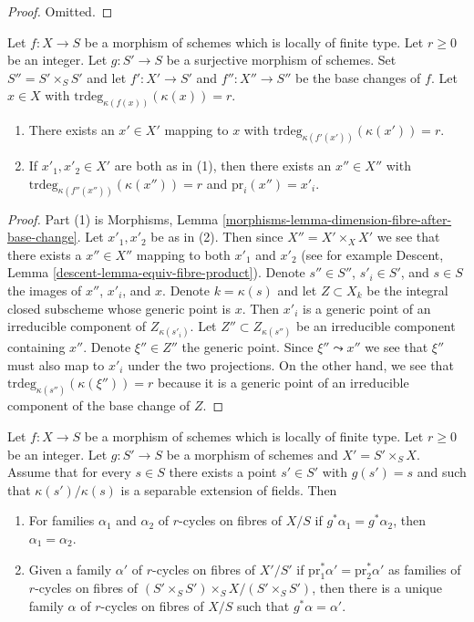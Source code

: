 \begin{proof}
Omitted.
\end{proof}

\begin{lemma}
\label{lemma-coequalizer-dim-r}
Let $f : X \to S$ be a morphism of schemes which is locally of finite type.
Let $r \geq 0$ be an integer. Let $g : S' \to S$ be a surjective morphism of
schemes. Set $S'' = S' \times_S S'$ and let $f' : X' \to S'$
and $f'' : X'' \to S''$ be the base changes of $f$.
Let $x \in X$ with $\text{trdeg}_{\kappa(f(x))}(\kappa(x)) = r$.
\begin{enumerate}
\item There exists an $x' \in X'$ mapping to $x$
with $\text{trdeg}_{\kappa(f'(x'))}(\kappa(x')) = r$.
\item If $x'_1, x'_2 \in X'$ are both as in (1), then there
exists an $x'' \in X''$ with
$\text{trdeg}_{\kappa(f''(x''))}(\kappa(x'')) = r$ and
$\text{pr}_i(x'') = x'_i$.
\end{enumerate}
\end{lemma}

\begin{proof}
Part (1) is
Morphisms, Lemma \ref{morphisms-lemma-dimension-fibre-after-base-change}.
Let $x'_1, x'_2$ be as in (2). Then since $X'' = X' \times_X X'$
we see that there
exists a $x'' \in X''$ mapping to both $x'_1$ and $x'_2$ (see for
example Descent, Lemma \ref{descent-lemma-equiv-fibre-product}).
Denote $s'' \in S''$, $s'_i \in S'$, and $s \in S$ the images
of $x''$, $x'_i$, and $x$.
Denote $k = \kappa(s)$ and let $Z \subset X_k$ be the integral
closed subscheme whose generic point is $x$. Then $x'_i$
is a generic point of an irreducible component of $Z_{\kappa(s'_i)}$.
Let $Z'' \subset Z_{\kappa(s'')}$ be an irreducible component
containing $x''$. Denote $\xi'' \in Z''$ the generic point.
Since $\xi'' \leadsto x''$ we see that $\xi''$ must also
map to $x'_i$ under the two projections. On the other hand,
we see that $\text{trdeg}_{\kappa(s'')}(\kappa(\xi'')) = r$
because it is a generic
point of an irreducible component of the base change of $Z$.
\end{proof}

\begin{lemma}
\label{lemma-descend-family}
Let $f : X \to S$ be a morphism of schemes which is locally of finite type.
Let $r \geq 0$ be an integer. Let $g : S' \to S$ be a morphism of
schemes and $X' = S' \times_S X$. Assume that for every $s \in S$ there
exists a point $s' \in S'$ with $g(s') = s$ and such that
$\kappa(s')/\kappa(s)$ is a separable extension of fields. Then
\begin{enumerate}
\item For families $\alpha_1$ and $\alpha_2$ of $r$-cycles on fibres of $X/S$
if $g^*\alpha_1 = g^*\alpha_2$, then $\alpha_1 = \alpha_2$.
\item Given a family $\alpha'$ of $r$-cycles on fibres of $X'/S'$ if
$\text{pr}_1^*\alpha' = \text{pr}_2^*\alpha'$ as families of
$r$-cycles on fibres of $(S' \times_S S') \times_S X / (S' \times_S S')$,
then there is a unique family $\alpha$ of $r$-cycles on fibres of $X/S$
such that $g^*\alpha = \alpha'$.
\end{enumerate}
\end{lemma}

